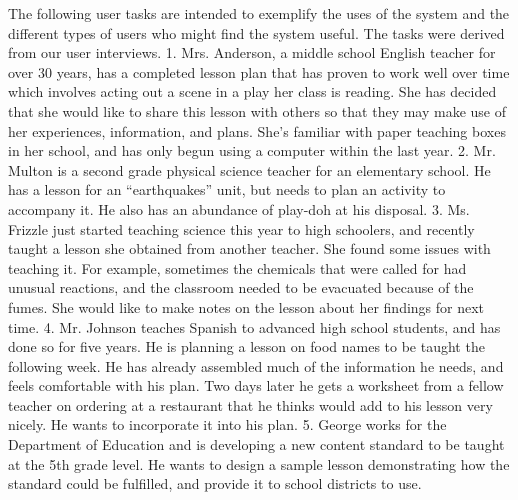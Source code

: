 \begin{enumerate}
The following user tasks are intended to exemplify the uses of the system and the different types of users who might find the system useful. The tasks were derived from our user interviews.
1. Mrs. Anderson, a middle school English teacher for over 30 years, has a completed lesson plan that has proven to work well over time which involves acting out a scene in a play her class is reading. She has decided that she would like to share this lesson with others so that they may make use of her experiences,
information, and plans.  She's familiar with paper teaching boxes in her school, and has only begun using a computer within the last year.
2. Mr. Multon is a second grade physical science teacher for an elementary school. He has a lesson for an ``earthquakes'' unit, but needs to plan an activity to accompany it.  He also has an abundance of play-doh at his disposal.
3. Ms. Frizzle just started teaching science this year to high schoolers, and recently taught a lesson she obtained from another teacher. She found some issues with teaching it.  For example, sometimes the chemicals that were called for had unusual reactions, and the classroom needed to be evacuated because of the fumes.  She would like to make notes on the lesson about her findings for next time.
4. Mr. Johnson teaches Spanish to advanced high school students, and has done so for five years. He is planning a lesson on food names to be taught the following week. He has already assembled much of the information he needs, and feels comfortable with his plan.  Two days later he gets a worksheet from a fellow teacher on ordering at a restaurant that he thinks would add to his lesson very nicely. He wants to incorporate it into his plan.
5. George works for the Department of Education and is developing a new content standard to be taught at the 5th grade level. He wants to design a sample lesson demonstrating how the standard could be fulfilled, and provide it to school districts to use.
\end{enumerate}

